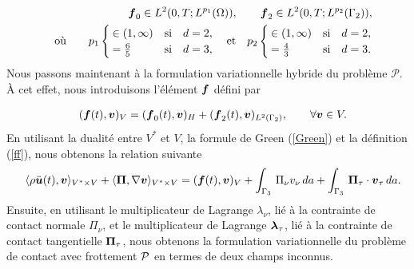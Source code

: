 \begin{eqnarray}
\label{f} 
  &&  \mbox{\boldmath{$f$}}_0 \in L^2(0,T;L^{p_1}(\Omega)), \qquad \mbox{\boldmath{$f$}}_2\in L^2(0,T;L^{p_2}(\Gamma_2)), \\
  &&   \textrm{où} \qquad p_1\begin{cases}
    \in (1,\infty) &\textrm{si}\quad d=2,\\
   =\frac{6}{5}&\textrm{si}\quad d=3,
    \end{cases}\quad\textrm{et}\quad p_2\begin{cases}
         \in (1,\infty) &\textrm{si}\quad d=2,\\
      = \frac{4}{3}&\textrm{si}\quad d=3 .
        \end{cases} \nonumber 
\end{eqnarray}
Nous passons maintenant à la formulation variationnelle hybride du problème ${\mathcal
P}$. À cet effet, nous introduisons l'élément $\mbox{\boldmath{$f$}}$ défini par

\begin{eqnarray}
&&\label{ff}(\mbox{\boldmath{$f$}}(t),\mbox{\boldmath{$v$}})_V=(\mbox{\boldmath{$f$}}_0(t),\mbox{\boldmath{$v$}})_H+(\mbox{\boldmath{$f$}}_2(t),\mbox{\boldmath{$v$}})_{L^2(\Gamma_2)},\qquad\forall\mbox{\boldmath{$v$}}\in V.
\end{eqnarray}
En utilisant la dualité entre $ V ^ * $ et $ V $, la formule de Green (\ref{Green}) et la définition (\ref{ff}), nous obtenons la relation suivante
\begin{eqnarray}
&& \langle{\rho\ddot{\mbox{\boldmath{$u$}}}(t),\mbox{\boldmath{$v$}}}\rangle_{{V^*}\times{V}} + \label{x1}\langle{\boldsymbol{\Pi},\nabla\mbox{\boldmath{$v$}}}\rangle_{{V^*}\times{V}}=(\mbox{\boldmath{$f$}}(t),\mbox{\boldmath{$v$}})_V
+\int_{\Gamma_3}\,\Pi_\nu
v_\nu\,da+\int_{\Gamma_3}\,\boldsymbol{\Pi}_\tau\cdot\mbox{\boldmath{$v$}}_\tau\,da.\nonumber
\end{eqnarray}
Ensuite, en utilisant le multiplicateur de Lagrange $\lambda_{\nu}$, lié à la contrainte de contact normale $\Pi_{\nu}$, et le multiplicateur de Lagrange $\mbox{\boldmath{$\lambda$}}_{\tau}$, lié à la contrainte de contact tangentielle $\mbox{\boldmath{$\Pi$}}_{\tau}$, nous obtenons la formulation variationnelle du problème de contact avec frottement ${\cal P}$ en termes de deux champs inconnus.\\

